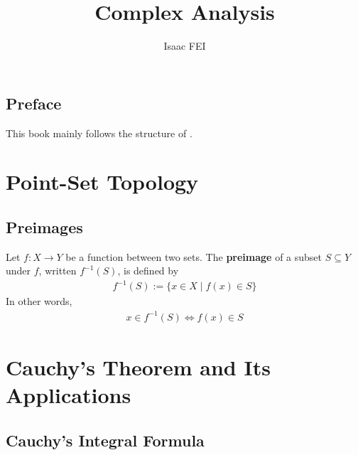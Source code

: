\documentclass[thmcnt=section, color=cyan, 12pt]{my-elegantbook}
\title{Complex Analysis}
\author{Isaac FEI}
\begin{document}
\maketitle


\frontmatter
\section*{Preface}

This book mainly follows the structure of \cite{steinComplexAnalysis2003}.


\tableofcontents
\mainmatter



\chapter{Point-Set Topology}


\section{Preimages}

Let $f: X \to Y$ be a function between two sets. The \textbf{preimage} of a subset $S \subseteq Y$ under $f$,
written $f^{-1}(S)$, is defined by
\begin{align*}
    f^{-1}(S) := \{x \in X \mid f(x) \in S\}
\end{align*}
In other words,
\begin{align*}
    x \in f^{-1}(S) \iff f(x) \in S
\end{align*}


\chapter{Cauchy's Theorem and Its Applications}


\section{Cauchy's Integral Formula}
\end{document}

